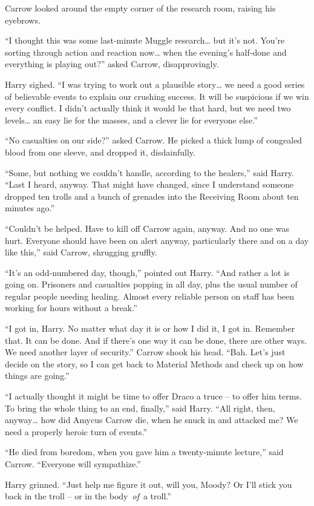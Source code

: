Carrow looked around the empty corner of the research room, raising his
eyebrows.

``I thought this was some last-minute Muggle research\ldots{} but it's
not. You're sorting through action and reaction now\ldots{} when the
evening's half-done and everything is playing out?'' asked Carrow,
disapprovingly.

Harry sighed. ``I was trying to work out a plausible story\ldots{} we
need a good series of believable events to explain our crushing success.
It will be suspicious if we win every conflict. I didn't actually think
it would be that hard, but we need two levels\ldots{} an easy lie for
the masses, and a clever lie for everyone else.''

``No casualties on our side?'' asked Carrow. He picked a thick lump of
congealed blood from one sleeve, and dropped it, disdainfully.

``Some, but nothing we couldn't handle, according to the healers,'' said
Harry. ``Last I heard, anyway. That might have changed, since I
understand someone dropped ten trolls and a bunch of grenades into the
Receiving Room about ten minutes ago.''

``Couldn't be helped. Have to kill off Carrow again, anyway. And no one
was hurt. Everyone should have been on alert anyway, particularly there
and on a day like this,'' said Carrow, shrugging gruffly.

``It's an odd-numbered day, though,'' pointed out Harry. ``And rather a
lot is going on. Prisoners and casualties popping in all day, plus the
usual number of regular people needing healing. Almost every reliable
person on staff has been working for hours without a break.''

``I got in, Harry. No matter what day it is or how I did it, I got in.
Remember that. It can be done. And if there's one way it can be done,
there are other ways. We need another layer of security.'' Carrow shook
his head. ``Bah. Let's just decide on the story, so I can get back to
Material Methods and check up on how things are going.''

``I actually thought it might be time to offer Draco a truce -- to offer
him terms. To bring the whole thing to an end, finally,'' said Harry.
``All right, then, anyway\ldots{} how did Amycus Carrow die, when he
snuck in and attacked me? We need a properly heroic turn of events.''

``He died from boredom, when you gave him a twenty-minute lecture,''
said Carrow. ``Everyone will sympathize.''

Harry grinned. ``Just help me figure it out, will you, Moody? Or I'll
stick you back in the troll -- or in the body~\emph{of}~a troll.''
